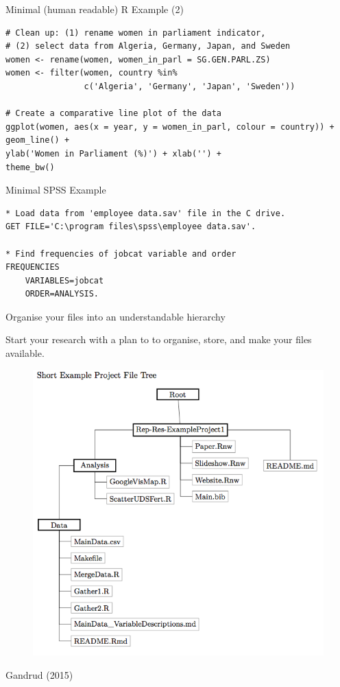\documentclass[10pt]{beamer}
\begin{document}
\begin{frame}[fragile]{Minimal (human readable) R Example (2)}

\begin{lstlisting}
# Clean up: (1) rename women in parliament indicator,
# (2) select data from Algeria, Germany, Japan, and Sweden
women <- rename(women, women_in_parl = SG.GEN.PARL.ZS)
women <- filter(women, country %in%
                c('Algeria', 'Germany', 'Japan', 'Sweden'))

# Create a comparative line plot of the data
ggplot(women, aes(x = year, y = women_in_parl, colour = country)) +
geom_line() +
ylab('Women in Parliament (%)') + xlab('') +
theme_bw()
\end{lstlisting}

\end{frame}


\begin{frame}[fragile]{Minimal SPSS Example}

\begin{lstlisting}
* Load data from 'employee data.sav' file in the C drive.
GET FILE='C:\program files\spss\employee data.sav'.

* Find frequencies of jobcat variable and order
FREQUENCIES
    VARIABLES=jobcat
    ORDER=ANALYSIS.
\end{lstlisting}

\end{frame}

\begin{frame}{Organise your files into an understandable hierarchy}

    Start your research with a plan to to organise, store, and make your files available.

    \begin{figure}
        \includegraphics[scale=0.3]{img/file_tree.png}
    \end{figure}

{\tiny{Gandrud (2015)}}

\end{frame}
\end{document}
